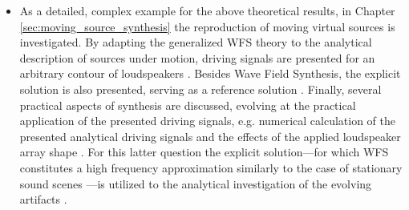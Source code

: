 \begin{itemize}
%
\item As a detailed, complex example for the above theoretical results, in Chapter \ref{sec:moving_source_synthesis} the reproduction of moving virtual sources is investigated.
By adapting the generalized WFS theory to the analytical description of sources under motion, driving signals are presented for an arbitrary contour of loudspeakers \cite{Firtha2015:daga, firtha2016wave, doi:10.1121/1.4996126}.
Besides Wave Field Synthesis, the explicit solution is also presented, serving as a reference solution \cite{Firtha2014:daga, Firtha2014:isma}.
Finally, several practical aspects of synthesis are discussed, evolving at the practical application of the presented driving signals, e.g. numerical calculation of the presented analytical driving signals and the effects of the applied loudspeaker array shape \cite{Firtha2018_daga_moving_source}.
For this latter question the explicit solution---for which WFS constitutes a high frequency approximation similarly to the case of stationary sound scenes \cite{firtha2015sound}---is utilized to the analytical investigation of the evolving artifacts \cite{firtha2016:daga}.
\end{itemize}
